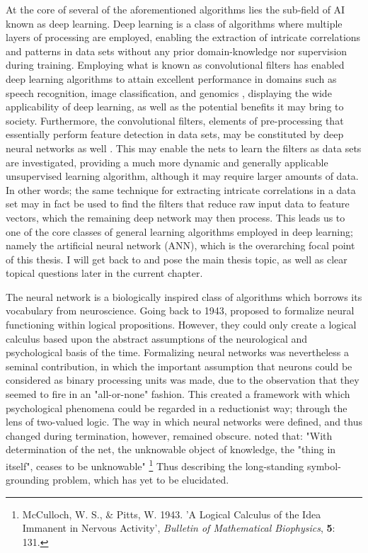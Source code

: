 At the core of several of the aforementioned algorithms lies the sub-field of AI known as deep learning. Deep learning is a class of algorithms where multiple layers of processing are employed, enabling the extraction of intricate correlations and patterns in data sets without any prior domain-knowledge nor supervision during training. Employing what is known as convolutional filters has enabled deep learning algorithms to attain excellent performance in domains such as speech recognition, image classification, and genomics \citep{LeCun2015}, displaying the wide applicability of deep learning, as well as the potential benefits it may bring to society. Furthermore, the convolutional filters, elements of pre-processing that essentially perform feature detection in data sets, may be constituted by deep neural networks as well \citep{LeCun2015}. This may enable the nets to learn the filters as data sets are investigated, providing a much more dynamic and generally applicable unsupervised learning algorithm, although it may require larger amounts of data. In other words; the same technique for extracting intricate correlations in a data set may in fact be used to find the filters that reduce raw input data to feature vectors, which the remaining deep network may then process. This leads us to one of the core classes of general learning algorithms employed in deep learning; namely the artificial neural network (ANN), which is the overarching focal point of this thesis. I will get back to and pose the main thesis topic, as well as clear topical questions later in the current chapter.

The neural network is a biologically inspired class of algorithms which borrows its vocabulary from neuroscience. Going back to 1943, \cite{McCulloch1943} proposed to formalize neural functioning within logical propositions.
However, they could only create a logical calculus based upon the abstract assumptions of the neurological and psychological basis of the time. Formalizing neural networks was nevertheless a seminal contribution, in which the important assumption that neurons could be considered as binary processing units was made, due to the observation that they seemed to fire in an "all-or-none" fashion. This created a framework with which psychological phenomena could be regarded in a reductionist way; through the lens of two-valued logic. The way in which neural networks were defined, and thus changed during termination, however, remained obscure. \cite{McCulloch1943} noted that: "With determination of the net, the unknowable object of knowledge, the "thing in itself", ceases to be unknowable"
\footnote{McCulloch, W. S., \& Pitts, W. 1943. 'A Logical Calculus of the Idea Immanent in Nervous Activity', \textit{Bulletin of Mathematical Biophysics}, \textbf{5}: 131.}
Thus describing the long-standing symbol-grounding problem, which has yet to be elucidated.

